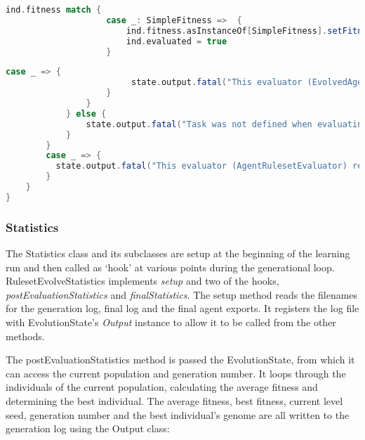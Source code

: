 \begin{minipage}{0.9\linewidth}
\centering
\begin{lstlisting}[language=scala]
                ind.fitness match {
                    case _: SimpleFitness =>  {
                        ind.fitness.asInstanceOf[SimpleFitness].setFitness(state, iFitness.toDouble, false)
                        ind.evaluated = true
                    }
\end{lstlisting}
\end{minipage}

\begin{minipage}{0.9\linewidth}
\centering
\begin{lstlisting}[language=scala]
                    case _ => {
                         state.output.fatal("This evaluator (EvolvedAgentRulesetEvaluator) requires a individuals to have SimpleFitness")
                    }
                }
            } else {
                state.output.fatal("Task was not defined when evaluating individual, implying prepareToEvaluate was not run on this instance.")
            }
        }
        case _ => {
          state.output.fatal("This evaluator (AgentRulesetEvaluator) requires a ByteVectorIndividual")
        }
    }
}

\end{lstlisting}
\end{minipage}

\subsubsection{Statistics}
\label{subsec:learnstats}

The Statistics class and its subclasses are setup at the beginning of the learning run and then called as `hook' at various points during the generational loop. RulesetEvolveStatistics implements \emph{setup} and two of the hooks, \emph{postEvaluationStatistics} and \emph{finalStatistics}. The setup method reads the filenames for the generation log, final log and the final agent exports. It registers the log file with EvolutionState's \emph{Output} instance to allow it to be called from the other methods. 

The postEvaluationStatistics method is passed the EvolutionState, from which it can access the current population and generation number. It loops through the individuals of the current population, calculating the average fitness and determining the best individual. The average fitness, best fitness, current level seed, generation number and the best individual's genome are all written to the generation log using the Output class:


